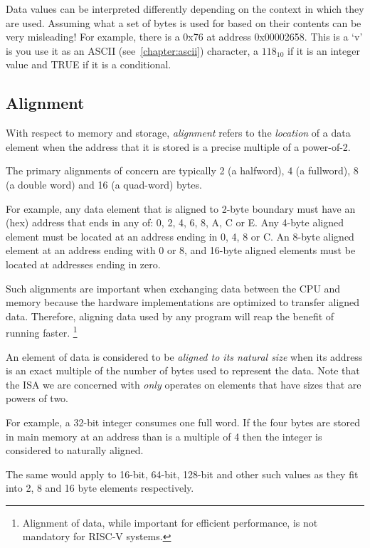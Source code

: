 Data values can be interpreted differently depending on the context in 
which they are used.  Assuming what a set of bytes is used for based on 
their contents can be very misleading!  For example, there is a 0x76 at 
address 0x00002658.  This is a `v' is you use it as an ASCII 
(see~\autoref{chapter:ascii}) character, a $118_{10}$ if it is an integer 
value and TRUE if it is a conditional.

\subsection{Alignment}

%
With respect to memory and storage, {\em \gls{alignment}} refers to the 
{\em location} of a data element when the address that it is stored is 
a precise multiple of a power-of-2. 

The primary alignments of concern are typically 2 (a halfword), 
4 (a fullword), 8 (a double word) and 16 (a quad-word) bytes.

For example, any data element that is aligned to 2-byte boundary
must have an (hex) address that ends in any of: 0, 2, 4, 6, 8, A, 
C or E.
Any 4-byte aligned element must be located at an address ending
in 0, 4, 8 or C.  An 8-byte aligned element at an address ending
with 0 or 8, and 16-byte aligned elements must be located at
addresses ending in zero.

Such alignments are important when exchanging data between the CPU 
and memory because the hardware implementations are optimized to
transfer aligned data.  Therefore, aligning data used by any program
will reap the benefit of running faster.%
\footnote{Alignment of data, while important for efficient performance, 
is not mandatory for RISC-V systems.\cite[p.~19]{rvismv1v22:2017}}

An element of data is considered to be {\em aligned to its natural size}
when its address is an exact multiple of the number of bytes used to 
represent the data.  Note that the ISA we are concerned with {\em only}
operates on elements that have sizes that are powers of two.

For example, a 32-bit integer consumes one full word.  If the four bytes
are stored in main memory at an address than is a multiple of 4 then
the integer is considered to naturally aligned.  

The same would apply to 16-bit, 64-bit, 128-bit and other such values 
as they fit into 2, 8 and 16 byte elements respectively.

